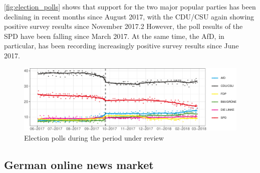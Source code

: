 \documentclass[
]{article}
\begin{document}
\autoref{fig:election_polls} shows that support for the two major
popular parties has been declining in recent months since August 2017,
with the CDU/CSU again showing positive survey results since November
2017.2 However, the poll results of the SPD have been falling since
March 2017. At the same time, the AfD, in particular, has been recording
increasingly positive survey results since June 2017.

\begin{figure}

{\centering \includegraphics[width=0.9\linewidth]{main_text_files/figure-latex/election polls-1} 

}

\caption{Election polls during the period under review \label{fig:election_polls}}\label{fig:election polls}
\end{figure}

\hypertarget{german-online-news-market}{%
\subsection{German online news market}\label{german-online-news-market}}
\end{document}
